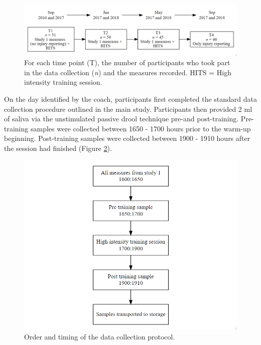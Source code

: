 \documentclass[
  english,
  man,floatsintext]{apa6}
\begin{document}
\begin{figure}[H]

{\centering \includegraphics[width=1\linewidth]{figs/study2/study2design_new} 

}

\caption{For each time point (T), the number of participants who took part in the data collection (\emph{n}) and the measures recorded. HITS = High intensity training session.}\label{fig:studytwodesign}
\end{figure}

On the day identified by the coach, participants first completed the standard data collection procedure outlined in the main study.
Participants then provided 2 ml of saliva via the unstimulated passive drool technique pre-and post-training.
Pre-training samples were collected between 1650 - 1700 hours prior to the warm-up beginning.
Post-training samples were collected between 1900 - 1910 hours after the session had finished (Figure \ref{fig:studytwoprotocol}).

\begin{figure}[H]

{\centering \includegraphics[width=1\linewidth]{figs/study2/study2protocol} 

}

\caption{Order and timing of the data collection protocol.}\label{fig:studytwoprotocol}
\end{figure}
\end{document}
